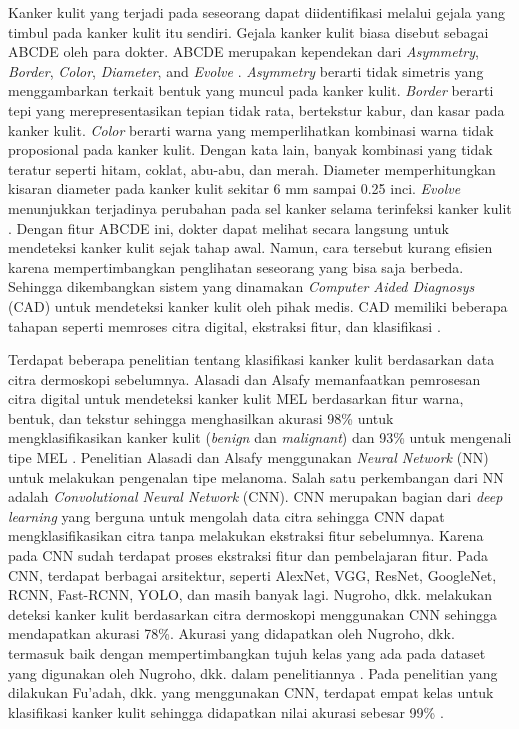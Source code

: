     Kanker kulit yang terjadi pada seseorang dapat diidentifikasi melalui gejala yang timbul pada kanker kulit itu sendiri. Gejala kanker kulit biasa disebut sebagai ABCDE oleh para dokter. ABCDE merupakan kependekan dari \textit{Asymmetry}, \textit{Border}, \textit{Color}, \textit{Diameter}, and \textit{Evolve} \citep{Gavrilov2019a}. \textit{Asymmetry} berarti tidak simetris yang menggambarkan terkait bentuk yang muncul pada kanker kulit. \textit{Border} berarti tepi yang merepresentasikan tepian tidak rata, bertekstur kabur, dan kasar pada kanker kulit. \textit{Color} berarti warna yang memperlihatkan kombinasi warna tidak proposional pada kanker kulit. Dengan kata lain, banyak kombinasi yang tidak teratur seperti hitam, coklat, abu-abu, dan merah. Diameter memperhitungkan kisaran diameter pada kanker kulit sekitar 6 mm sampai 0.25 inci. \textit{Evolve} menunjukkan terjadinya perubahan pada sel kanker selama terinfeksi kanker kulit \citep{Saherish2020a}. Dengan fitur ABCDE ini, dokter dapat melihat secara langsung untuk mendeteksi kanker kulit sejak tahap awal. Namun, cara tersebut kurang efisien karena mempertimbangkan penglihatan seseorang yang bisa saja berbeda. Sehingga dikembangkan sistem yang dinamakan \textit{Computer Aided Diagnosys} (CAD) untuk mendeteksi kanker kulit oleh pihak medis. CAD memiliki beberapa tahapan seperti memroses citra digital, ekstraksi fitur, dan klasifikasi \citep{Adyanti2017}.

    Terdapat beberapa penelitian tentang klasifikasi kanker kulit berdasarkan data citra dermoskopi sebelumnya. Alasadi dan Alsafy memanfaatkan pemrosesan citra digital untuk mendeteksi kanker kulit MEL berdasarkan fitur warna, bentuk, dan tekstur sehingga menghasilkan akurasi 98\% untuk mengklasifikasikan kanker kulit (\textit{benign} dan \textit{malignant}) dan 93\% untuk mengenali tipe MEL \citep{Alasadi2015a}. Penelitian Alasadi dan Alsafy menggunakan \textit{Neural Network} (NN) untuk melakukan pengenalan tipe melanoma. Salah satu perkembangan dari NN adalah \textit{Convolutional Neural Network} (CNN). CNN merupakan bagian dari \textit{deep learning} yang berguna untuk mengolah data citra sehingga CNN dapat mengklasifikasikan citra tanpa melakukan ekstraksi fitur sebelumnya. Karena pada CNN sudah terdapat proses ekstraksi fitur dan pembelajaran fitur. Pada CNN, terdapat berbagai arsitektur, seperti AlexNet, VGG, ResNet, GoogleNet, RCNN, Fast-RCNN, YOLO, dan masih banyak lagi. Nugroho, dkk. melakukan deteksi kanker kulit berdasarkan citra dermoskopi menggunakan CNN sehingga mendapatkan akurasi 78\%. Akurasi yang didapatkan oleh Nugroho, dkk. termasuk baik dengan mempertimbangkan tujuh kelas yang ada pada dataset yang digunakan oleh Nugroho, dkk. dalam penelitiannya \citep{Nugroho2019}. Pada penelitian yang dilakukan Fu’adah, dkk. yang menggunakan CNN, terdapat empat kelas untuk klasifikasi kanker kulit sehingga didapatkan nilai akurasi sebesar 99\% \citep{Fuadah2020a}.

